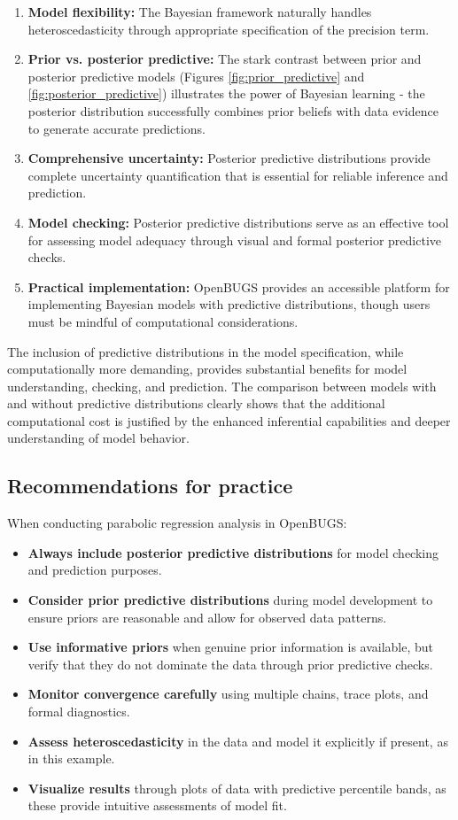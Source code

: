 \begin{enumerate}
\item \textbf{Model flexibility:} The Bayesian framework naturally handles heteroscedasticity through appropriate specification of the precision term.
\item \textbf{Prior vs. posterior predictive:} The stark contrast between prior and posterior predictive models (Figures \ref{fig:prior_predictive} and \ref{fig:posterior_predictive}) illustrates the power of Bayesian learning - the posterior distribution successfully combines prior beliefs with data evidence to generate accurate predictions.
\item \textbf{Comprehensive uncertainty:} Posterior predictive distributions provide complete uncertainty quantification that is essential for reliable inference and prediction.
\item \textbf{Model checking:} Posterior predictive distributions serve as an effective tool for assessing model adequacy through visual and formal posterior predictive checks.
\item \textbf{Practical implementation:} OpenBUGS provides an accessible platform for implementing Bayesian models with predictive distributions, though users must be mindful of computational considerations.
\end{enumerate}

The inclusion of predictive distributions in the model specification, while computationally more demanding, provides substantial benefits for model understanding, checking, and prediction. The comparison between models with and without predictive distributions clearly shows that the additional computational cost is justified by the enhanced inferential capabilities and deeper understanding of model behavior.

\subsection{Recommendations for practice}

When conducting parabolic regression analysis in OpenBUGS:
\begin{itemize}
\item \textbf{Always include posterior predictive distributions} for model checking and prediction purposes.
\item \textbf{Consider prior predictive distributions} during model development to ensure priors are reasonable and allow for observed data patterns.
\item \textbf{Use informative priors} when genuine prior information is available, but verify that they do not dominate the data through prior predictive checks.
\item \textbf{Monitor convergence carefully} using multiple chains, trace plots, and formal diagnostics.
\item \textbf{Assess heteroscedasticity} in the data and model it explicitly if present, as in this example.
\item \textbf{Visualize results} through plots of data with predictive percentile bands, as these provide intuitive assessments of model fit.
\end{itemize}

